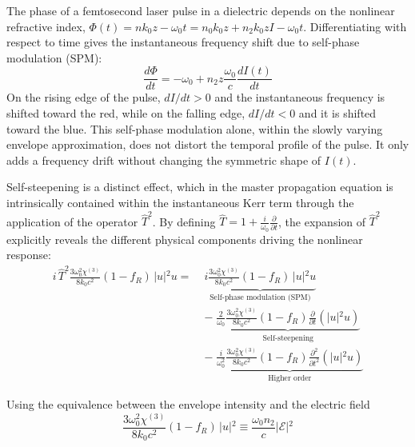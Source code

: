 The phase of a femtosecond laser pulse in a dielectric depends on the nonlinear refractive index, $\Phi(t) = nk_0z - \omega_0 t = n_0k_0z + n_2k_0zI - \omega_0 t$. Differentiating with respect to time gives the instantaneous frequency shift due to self-phase modulation (SPM):\begin{equation}\frac{d\Phi}{dt} = -\omega_0 + n_2z\frac{\omega_0}{c}\frac{dI(t)}{dt}\end{equation}On the rising edge of the pulse, $dI/dt > 0$ and the instantaneous frequency is shifted toward the red, while on the falling edge, $dI/dt < 0$ and it is shifted toward the blue. This self-phase modulation alone, within the slowly varying envelope approximation, does not distort the temporal profile of the pulse. It only adds a frequency drift without changing the symmetric shape of $I(t)$.

Self-steepening is a distinct effect, which in the master propagation equation is intrinsically contained within the instantaneous Kerr term through the application of the operator $\hat{T}^2$. By defining $\hat{T} = 1 + \frac{i}{\omega_0}\frac{\partial}{\partial t}$, the expansion of $\hat{T}^2$ explicitly reveals the different physical components driving the nonlinear response:
\begin{align*}
i\,\hat{T}^{2}\frac{3\omega_0^2\chi^{(3)}}{8k_0c^2}(1-f_R)\,\vert{}u\vert{}^2u =\;& \underbrace{i\frac{3\omega_0^2\chi^{(3)}}{8k_0c^2}(1-f_R)\,\vert{}u\vert{}^2u}_{\text{Self-phase modulation (SPM)}} \\
&-\; \underbrace{\frac{2}{\omega_0}\frac{3\omega_0^2\chi^{(3)}}{8k_0c^2}(1-f_R)\frac{\partial}{\partial t}\!\left(\vert{}u\vert{}^2u\right)}_{\text{Self-steepening}} \\
&-\; \underbrace{\frac{i}{\omega_0^{2}}\frac{3\omega_0^2\chi^{(3)}}{8k_0c^2}(1-f_R)\frac{\partial^2}{\partial t^2}\!\left(\vert{}u\vert{}^2u\right)}_{\text{Higher order}}
\end{align*}



Using the equivalence between the envelope intensity and the electric field $$\frac{3\omega_0^2\chi^{(3)}}{8k_0c^2}(1-f_R)\,\vert{}u\vert{}^2 \equiv \frac{\omega_0 n_2}{c}\vert{}\mathcal{E}\vert{}^2$$

